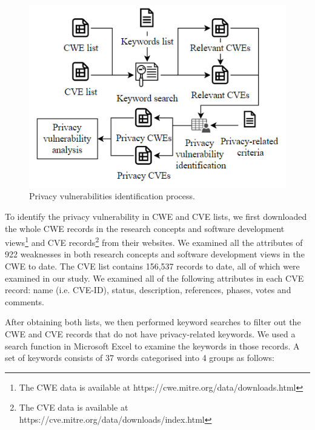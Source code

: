\begin{figure}[ht]
	\centering
	\includegraphics[width=.9\linewidth]{figures/privacy-vulnerability-identification.png}
	\caption{Privacy vulnerabilities identification process.}
	\label{fig:privacy-vul-identification}
\end{figure}

To identify the privacy vulnerability in CWE and CVE lists, we first downloaded the whole CWE records in the research concepts and software development views\footnote{The CWE data is available at https://cwe.mitre.org/data/downloads.html} and CVE records\footnote{The CVE data is available at https://cve.mitre.org/data/downloads/index.html} from their websites. We examined all the attributes of 922 weaknesses in both research concepts and software development views in the CWE to date. The CVE list contains 156,537 records to date, all of which were examined in our study. We examined all of the following attributes in each CVE record: name (i.e. CVE-ID), status, description, references, phases, votes and comments.

After obtaining both lists, we then performed keyword searches to filter out the CWE and CVE records that do not have privacy-related keywords. We used a search function in Microsoft Excel to examine the keywords in those records. A set of keywords consists of 37 words categorised into 4 groups as follows:

